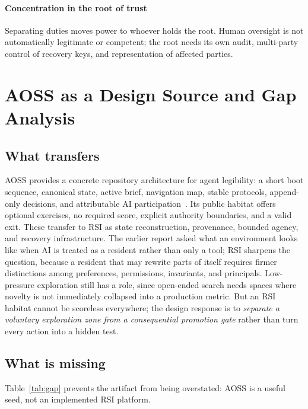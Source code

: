 \documentclass[11pt,a4paper]{article}
\begin{document}
\paragraph{Concentration in the root of trust} Separating duties moves power to whoever holds the root. Human oversight is not automatically legitimate or competent; the root needs its own audit, multi-party control of recovery keys, and representation of affected parties.

\section{AOSS as a Design Source and Gap Analysis}\label{sec:aoss}
\subsection{What transfers}
AOSS provides a concrete repository architecture for agent legibility: a short boot sequence, canonical state, active brief, navigation map, stable protocols, append-only decisions, and attributable AI participation~\cite{aoss2026}. Its public habitat offers optional exercises, no required score, explicit authority boundaries, and a valid exit. These transfer to RSI as state reconstruction, provenance, bounded agency, and recovery infrastructure. The earlier report asked what an environment looks like when AI is treated as a resident rather than only a tool; RSI sharpens the question, because a resident that may rewrite parts of itself requires firmer distinctions among preferences, permissions, invariants, and principals. Low-pressure exploration still has a role, since open-ended search needs spaces where novelty is not immediately collapsed into a production metric. But an RSI habitat cannot be scoreless everywhere; the design response is to \emph{separate a voluntary exploration zone from a consequential promotion gate} rather than turn every action into a hidden test.

\subsection{What is missing}
Table~\ref{tab:gap} prevents the artifact from being overstated: AOSS is a useful seed, not an implemented RSI platform.
\end{document}
